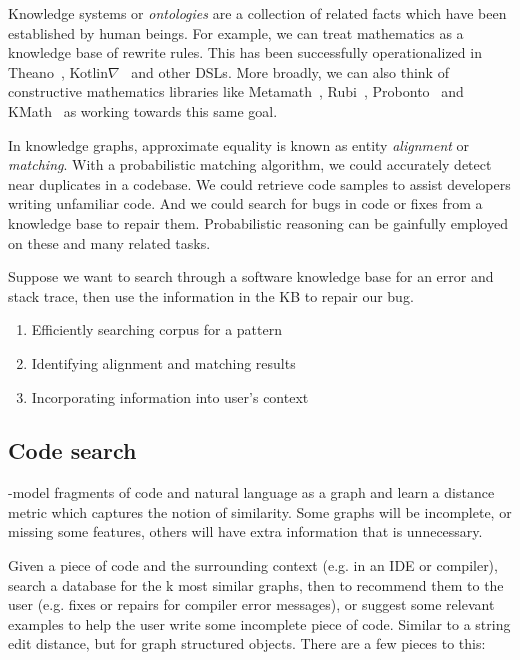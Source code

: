 \documentclass[11pt]{article}
\begin{document}
    Knowledge systems or \textit{ontologies} are a collection of related facts which have been established by human beings. For example, we can treat mathematics as a knowledge base of rewrite rules. This has been successfully operationalized in Theano~\citep{bergstra2010theano}, Kotlin$\nabla$~\citep{considine2019kotlingrad} and other DSLs. More broadly, we can also think of constructive mathematics libraries like Metamath~\citep{megill2006metamath}, Rubi~\citep{rich2009knowledge}, Probonto~\citep{swat2016probonto} and KMath~\citep{nozik2019kotlin} as working towards this same goal.

    In knowledge graphs, approximate equality is known as entity \textit{alignment} or \textit{matching}. With a probabilistic matching algorithm, we could accurately detect near duplicates in a codebase. We could retrieve code samples to assist developers writing unfamiliar code. And we could search for bugs in code or fixes from a knowledge base to repair them. Probabilistic reasoning can be gainfully employed on these and many related tasks.

    Suppose we want to search through a software knowledge base for an error and stack trace, then use the information in the KB to repair our bug.

    \begin{enumerate}
        \item Efficiently searching corpus for a pattern
        \item Identifying alignment and matching results
        \item Incorporating information into user's context
    \end{enumerate}

    \subsection{Code search}

    -model fragments of code and natural language as a graph and learn a distance metric which captures the notion of similarity. Some graphs will be incomplete, or missing some features, others will have extra information that is unnecessary.

    Given a piece of code and the surrounding context (e.g. in an IDE or compiler), search a database for the k most similar graphs, then to recommend them to the user (e.g. fixes or repairs for compiler error messages), or suggest some relevant examples to help the user write some incomplete piece of code. Similar to a string edit distance, but for graph structured objects. There are a few pieces to this:
\end{document}

